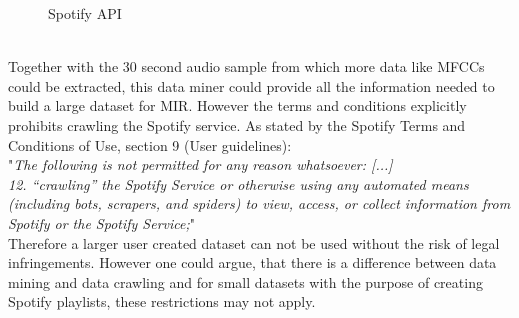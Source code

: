 \begin{figure}[htbp]
	\centering
	\caption{Spotify API}
	\label{fig:spotify}
\end{figure}
\FloatBarrier
\ \\
Together with the 30 second audio sample from which more data like MFCCs could be extracted, this data miner could provide all the information needed to build a large dataset for MIR. However the terms and conditions explicitly prohibits crawling the Spotify service. As stated by the Spotify Terms and Conditions of Use, section 9 (User guidelines):\\
"\textit{The following is not permitted for any reason whatsoever: [...]\\
12. “crawling” the Spotify Service or otherwise using any automated means (including bots, scrapers, and spiders) to view, access, or collect information from Spotify or the Spotify Service;}" \cite{spottac1}\\
Therefore a larger user created dataset can not be used without the risk of legal infringements. However one could argue, that there is a difference between data mining and data crawling and for small datasets with the purpose of creating Spotify playlists, these restrictions may not apply.\\ 
